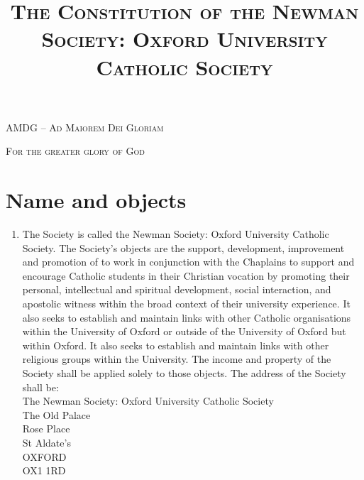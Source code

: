 \documentclass[11pt]{article}
\date{}
\title{\scshape{The Constitution of the Newman Society: Oxford University Catholic Society}}
\begin{document}
\renewcommand{\theenumi}{\Alph{enumi}}
\renewcommand{\theenumii}{(\roman{enumii})}
\setcounter{tocdepth}{1}
\maketitle
\centerline{\scshape{AMDG -- Ad Maiorem Dei Gloriam}}

\centerline{\scshape{For the greater glory of God}}
\tableofcontents
{}
\section{Name and objects}\label{sec:nam}
\begin{enumerate}
\item \label{nam:aim}The Society is called the Newman Society: Oxford University Catholic Society. The Society's objects are the support, development, improvement and promotion of to work in conjunction with the Chaplains to support and encourage Catholic students in their Christian vocation by promoting their personal, intellectual and spiritual development, social interaction, and apostolic witness within the broad context of their university experience.  It also seeks to establish and maintain links with other Catholic organisations within the University of Oxford or outside of the University of Oxford but within Oxford. It also seeks to establish and maintain links with other religious groups within the University. The income and property of the Society shall be applied solely to those objects.  The address of the Society shall be: \\
The Newman Society: Oxford University Catholic Society\\
The Old Palace\\
Rose Place\\
St Aldate's\\
OXFORD\\
OX1 1RD


\end{enumerate}
\end{document}
